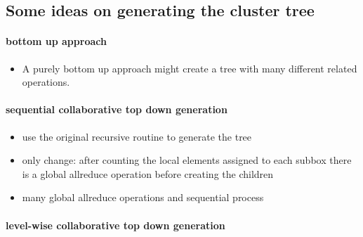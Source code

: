 \documentclass[a4paper]{scrartcl}
\begin{document}
\subsection{Some ideas on generating the cluster tree}

\paragraph{bottom up approach}
\begin{itemize}
\item A purely bottom up approach might create a tree with many different
  related operations.
\end{itemize}

\paragraph{sequential collaborative top down generation}
\begin{itemize}
\item use the original recursive routine to generate the tree
\item only change: after counting the local elements assigned to each subbox
  there is a global allreduce operation before creating the children
\item many global allreduce operations and sequential process
\end{itemize}

\paragraph{level-wise collaborative top down generation}
\end{document}
